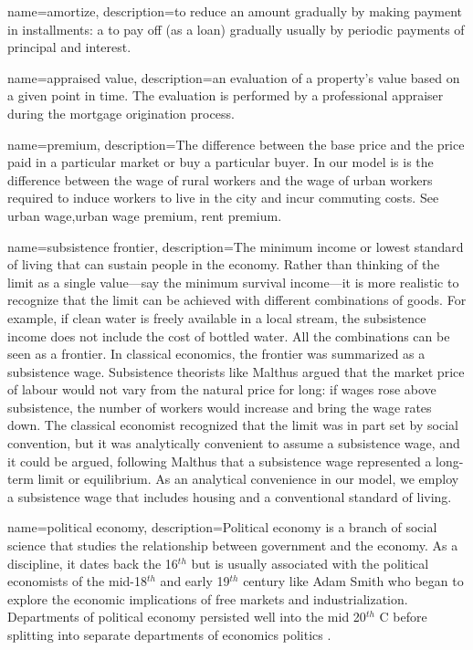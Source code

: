 {
name=amortize,
description={to reduce an amount gradually by making payment in installments: a to pay off (as a loan) gradually usually by periodic payments of principal and interest. }
}

{
name=appraised value,
description={an evaluation of a property's value based on a given point in time. The evaluation is performed by a professional appraiser during the mortgage origination process.}
}

{
name=premium,
description={The difference between the base price and the price paid in a particular market or buy a particular buyer. In our model is is the difference between the wage of rural workers and the wage of urban workers required to induce workers to live in the city and incur commuting costs. See \gls{urban wage},\gls{urban wage premium}, \gls{rent premium}.}
}

{
name=subsistence frontier,
description={The minimum income or lowest standard of living that can sustain people in the economy. Rather than thinking of the limit as a single value---say the minimum survival income---it is more realistic to recognize that the limit can be achieved with different combinations of goods. For example, if clean water is freely available in a local stream, the subsistence income does not include the cost of bottled water. All the combinations can be seen as a \gls{frontier}. \newline In classical economics, the frontier was summarized as a subsistence wage. Subsistence theorists like Malthus argued that the market price of labour would not vary from the natural price for long: if wages rose above subsistence, the number of workers would increase and bring the wage rates down. The classical economist recognized that the limit was in part set by social convention, but it was analytically convenient to assume a subsistence wage, and it could be argued, following Malthus that a subsistence wage  represented a long-term limit or \gls{equilibrium}. As an analytical convenience in our model, we employ a subsistence wage that includes housing and a conventional standard of living.  }
}

{
name=political economy,
description={Political economy is a branch of social science that studies the relationship  between government and the economy. As a discipline, it dates back the  16$^{th}$ but is usually associated with the political economists of the mid-18$^{th}$ and  early 19$^{th}$  century like Adam Smith who began to explore the economic implications of free markets and industrialization. Departments of political economy persisted well into the mid 20$^{th}$ C before splitting into separate departments of economics politics \cite{helleiner20PoliticalEconomy2018}.}
}

